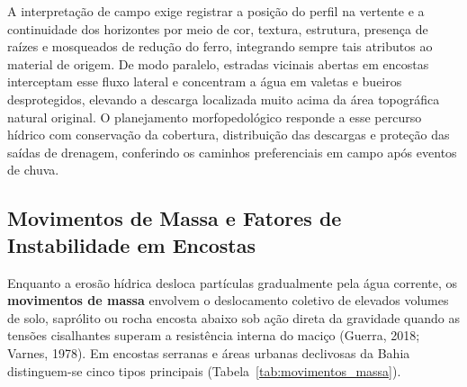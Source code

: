 A interpretação de campo exige registrar a posição do perfil na vertente e a continuidade dos horizontes por meio de cor, textura, estrutura, presença de raízes e mosqueados de redução do ferro, integrando sempre tais atributos ao material de origem. De modo paralelo, estradas vicinais abertas em encostas interceptam esse fluxo lateral e concentram a água em valetas e bueiros desprotegidos, elevando a descarga localizada muito acima da área topográfica natural original. O planejamento morfopedológico responde a esse percurso hídrico com conservação da cobertura, distribuição das descargas e proteção das saídas de drenagem, conferindo os caminhos preferenciais em campo após eventos de chuva.

\subsection{Movimentos de Massa e Fatores de Instabilidade em Encostas}

Enquanto a erosão hídrica desloca partículas gradualmente pela água corrente, os \textbf{movimentos de massa} envolvem o deslocamento coletivo de elevados volumes de solo, saprólito ou rocha encosta abaixo sob ação direta da gravidade quando as tensões cisalhantes superam a resistência interna do maciço (Guerra, 2018; Varnes, 1978). Em encostas serranas e áreas urbanas declivosas da Bahia distinguem-se cinco tipos principais (Tabela~\ref{tab:movimentos_massa}).

